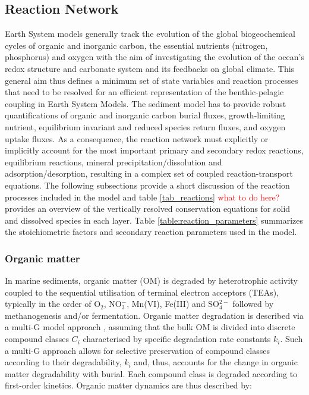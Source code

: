 \documentclass[gmd, manuscript]{copernicus}
\begin{document}
\subsection{Reaction Network}
Earth System models generally track the evolution of the global biogeochemical cycles of organic and inorganic carbon, the essential nutrients (nitrogen, phosphorus) and oxygen with the aim of investigating the evolution 
of the ocean's redox structure and carbonate system and its feedbacks on global climate. This general aim thus defines a minimum set of state variables and reaction processes that need to be resolved for an efficient 
representation of the benthic-pelagic coupling in Earth System Models. The sediment model has to provide robust quantifications of organic and inorganic carbon burial fluxes, growth-limiting nutrient, equilibrium invariant 
and reduced species return fluxes, and oxygen uptake fluxes. As a consequence, the reaction network must explicitly or implicitly account for the most important primary and secondary redox reactions, equilibrium reactions, 
mineral precipitation/dissolution and adsorption/desorption, resulting in a complex set of coupled reaction-transport equations. The following 
subsections provide a short discussion of the reaction processes included in the model and table \ref{tab_reactions} \textcolor{red}{what to do here?} provides an overview of the vertically resolved conservation equations for solid and dissolved species 
in each layer. Table \ref{table:reaction_parameters} summarizes the stoichiometric factors and secondary reaction parameters used in the model.

\subsubsection{Organic matter}
In marine sediments, organic matter (OM) is degraded by heterotrophic activity coupled to the sequential utilisation of terminal electron acceptors (TEAs), typically in the order of O$_2$, NO$_3^-$, Mn(VI), Fe(III) and SO$_4^{2-}$ 
followed by methanogenesis and/or fermentation. Organic matter degradation is described via a multi-G model approach \citep[][and references therein]{arndt_quantifying_2013}, assuming that the bulk OM is divided 
into discrete compound classes $C_i$ characterised by specific degradation rate constants $k_i$. Such a multi-G approach allows for selective preservation of compound classes according to their degradability, $k_i$ and, thus, accounts 
for the change in organic matter degradability with burial. Each compound class is degraded according to first-order kinetics. Organic matter dynamics are thus described by:
\end{document}
